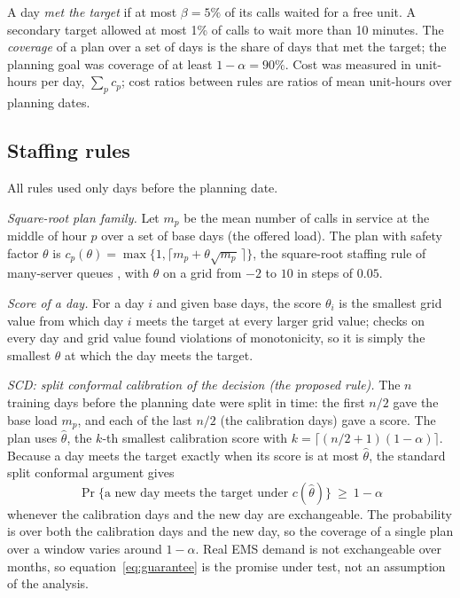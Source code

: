 \documentclass[11pt]{article}
\begin{document}
A day \emph{met the target} if at most $\beta=5\%$ of its calls waited for a free unit. A secondary target allowed at most 1\% of calls to wait more than 10 minutes. The \emph{coverage} of a plan over a set of days is the share of days that met the target; the planning goal was coverage of at least $1-\alpha=90\%$. Cost was measured in unit-hours per day, $\sum_p c_p$; cost ratios between rules are ratios of mean unit-hours over planning dates.

\subsection{Staffing rules}

All rules used only days before the planning date.

\emph{Square-root plan family.} Let $m_p$ be the mean number of calls in service at the middle of hour $p$ over a set of base days (the offered load). The plan with safety factor $\theta$ is $c_p(\theta)=\max\{1,\lceil m_p+\theta\sqrt{m_p}\,\rceil\}$, the square-root staffing rule of many-server queues \citep{halfin1981heavy,gans2003telephone}, with $\theta$ on a grid from $-2$ to $10$ in steps of $0.05$.

\emph{Score of a day.} For a day $i$ and given base days, the score $\theta_i$ is the smallest grid value from which day $i$ meets the target at every larger grid value; checks on every day and grid value found  violations of monotonicity, so it is simply the smallest $\theta$ at which the day meets the target.

\emph{SCD: split conformal calibration of the decision (the proposed rule).} The $n$ training days before the planning date were split in time: the first $n/2$ gave the base load $m_p$, and each of the last $n/2$ (the calibration days) gave a score. The plan uses $\hat\theta$, the $k$-th smallest calibration score with $k=\lceil(n/2+1)(1-\alpha)\rceil$. Because a day meets the target exactly when its score is at most $\hat\theta$, the standard split conformal argument \citep{vovk2022algorithmic,lei2018distribution} gives
\begin{equation}
\Pr\{\text{a new day meets the target under } c(\hat\theta)\}\ \ge\ 1-\alpha
\label{eq:guarantee}
\end{equation}
whenever the calibration days and the new day are exchangeable. The probability is over both the calibration days and the new day, so the coverage of a single plan over a window varies around $1-\alpha$. Real EMS demand is not exchangeable over months, so equation~\eqref{eq:guarantee} is the promise under test, not an assumption of the analysis.
\end{document}
